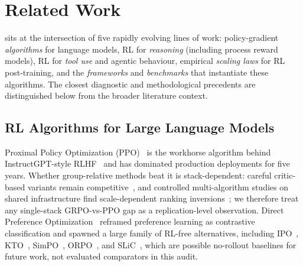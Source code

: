 
\section{Related Work}
\label{sec:related}

\ours{} sits at the intersection of five rapidly evolving lines of work:
policy-gradient \emph{algorithms} for language models, RL for \emph{reasoning}
(including process reward models), RL for \emph{tool use} and agentic behaviour,
empirical \emph{scaling laws} for RL post-training, and the \emph{frameworks}
and \emph{benchmarks} that instantiate these algorithms. The closest diagnostic and methodological precedents are distinguished below
from the broader literature context.

\subsection{RL Algorithms for Large Language Models}
\label{sec:related:algos}

Proximal Policy Optimization (PPO)~\cite{schulman2017proximal} is the workhorse
algorithm behind InstructGPT-style RLHF~\cite{ouyang2022training, christiano2017deeprlhf, stiennon2020summarize, bai2022hhrlhf, bai2022claudecai}
and has dominated production deployments for five years. Whether
group-relative methods beat it is stack-dependent: careful critic-based
variants remain competitive~\cite{kazemnejad2025vineppo, liu2025asyppo}, and
controlled multi-algorithm studies on shared infrastructure find
scale-dependent ranking inversions~\cite{li2026oxrl}; we therefore treat any
single-stack GRPO-vs-PPO gap as a replication-level observation. Direct Preference
Optimization~\cite{rafailov2024direct} reframed preference learning as
contrastive classification and spawned a large family of RL-free alternatives,
including IPO~\cite{azar2024ipo}, KTO~\cite{ethayarajh2024kto},
SimPO~\cite{meng2024simpo}, ORPO~\cite{hong2024orpo}, and
SLiC~\cite{zhao2023slic}, which are possible no-rollout baselines for future work, not evaluated
comparators in this audit.


